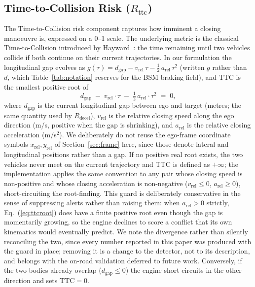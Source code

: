 \documentclass[sn-mathphys-num,Numbered,iicol]{sn-jnl}
\begin{document}
\subsection{Time-to-Collision Risk (\texorpdfstring{$R_{\mathrm{ttc}}$}{R\_ttc})}\label{sec:rttc}
The Time-to-Collision risk component captures how imminent a closing manoeuvre is, expressed on a 0--1 scale. The underlying metric is the classical Time-to-Collision introduced by Hayward~\cite{hayward1972}: the time remaining until two vehicles collide if both continue on their current trajectories. In our formulation the longitudinal gap evolves as $g(\tau) = d_{\mathrm{gap}} - v_{\mathrm{rel}}\,\tau - \tfrac{1}{2}\,a_{\mathrm{rel}}\,\tau^2$ (written $g$ rather than $d$, which Table~\ref{tab:notation} reserves for the BSM braking field), and $\mathrm{TTC}$ is the smallest positive root of
\begin{equation}
\label{eq:ttcroot}
  d_{\mathrm{gap}} \;-\; v_{\mathrm{rel}}\cdot \tau \;-\; \tfrac{1}{2}\,a_{\mathrm{rel}}\cdot \tau^2 \;=\; 0,
\end{equation}
where $d_{\mathrm{gap}}$ is the current longitudinal gap between ego and target (metres; the same quantity used by $R_{\mathrm{decel}}$), $v_{\mathrm{rel}}$ is the relative closing speed along the ego direction (m/s, positive when the gap is shrinking), and $a_{\mathrm{rel}}$ is the relative closing acceleration (m/s$^2$). We deliberately do not reuse the ego-frame coordinate symbols $x_{\mathrm{rel}}, y_{\mathrm{rel}}$ of Section~\ref{sec:frame} here, since those denote lateral and longitudinal positions rather than a gap. If no positive real root exists, the two vehicles never meet on the current trajectory and $\mathrm{TTC}$ is defined as $+\infty$; the implementation applies the same convention to any pair whose closing speed is non-positive and whose closing acceleration is non-negative ($v_{\mathrm{rel}} \le 0$, $a_{\mathrm{rel}} \ge 0$), short-circuiting the root-finding. This guard is deliberately conservative in the sense of suppressing alerts rather than raising them: when $a_{\mathrm{rel}} > 0$ strictly, Eq.~(\ref{eq:ttcroot}) does have a finite positive root even though the gap is momentarily growing, so the engine declines to score a conflict that its own kinematics would eventually predict. We note the divergence rather than silently reconciling the two, since every number reported in this paper was produced with the guard in place; removing it is a change to the detector, not to its description, and belongs with the on-road validation deferred to future work. Conversely, if the two bodies already overlap ($d_{\mathrm{gap}} \le 0$) the engine short-circuits in the other direction and sets $\mathrm{TTC} = 0$.
\end{document}
